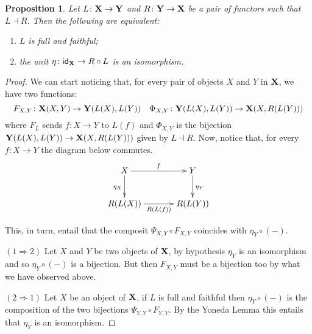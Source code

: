 \documentclass[a4paper]{article}
\newcommand{\id}[1]{\mathsf{id}_{#1}}
\def\R{\mathsf{R}}
\def\X{\textbf {\textup{X}}}
\def\Y{\textbf {\textup{Y}}}
\newtheorem{proposition}[theorem]{Proposition}
\theoremstyle{definition}
\begin{document}
\begin{proposition}\label{prop:counit}
Let $L\colon \X\to \Y$ and $R\colon \Y \to \X$ be a pair of functors such that $L\dashv R$. Then the following are equivalent:
\begin{enumerate}
	\item $L$ is full and faithful;
	\item the unit $\eta \colon \id{\X}\to R\circ L$ is an isomorphism.
\end{enumerate} 
\end{proposition}
\begin{proof}
	We can start noticing that, for every pair of objects $X$ and $Y$ in $\X$, we have two functions:
	\[F_{X, Y}\colon \X(X, Y)\to \Y(L(X), L(Y)) \quad 	 \Phi_{X, Y}\colon \Y(L(X), L(Y))\to \X(X, R(L(Y)))\]
	where $F_L$ sends $f\colon X\to Y$ to $L(f)$ and $\Phi_{X, Y}$ is the bijection $\Y(L(X), L(Y))\to \X(X, R(L(Y)))$ given by $L\dashv R$. Now, notice that, for every $f\colon X\to Y$ the diagram below commutes.
	\[\xymatrix@C=35pt{X \ar[r]^{f} \ar[d]_{\eta_X}& Y \ar[d]^{\eta_Y}\\R(L(X)) \ar[r]_-{R(L(f))} &R(L(Y)) }\]
	
This, in turn, entail that the composit $\Psi_{X,Y} \circ F_{X, Y}$ coincides with $\eta_Y\circ (-)$.
	
	\smallskip \noindent 
	$(1\Rightarrow 2)$ Let $X$ and $Y$ be two objects of $\X$, by hypothesis $\eta_Y$ is an isomorphism and so $\eta_Y\circ (-)$ is a bijection. But then $F_{X, Y}$ must be a bijection too by what we have observed above.
 	
	\smallskip \noindent 
	$(2\Rightarrow 1)$ Let $X$ be an object of $\X$, if $L$ is full and faithful then $\eta_Y\circ (-)$ is the composition of the two bijections $\Psi_{Y,Y}\circ F_{Y,Y}$. By the Yoneda Lemma this entails that $\eta_Y$ is an isomorphism.
\end{proof}
\end{document}
